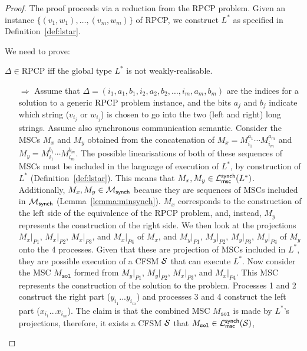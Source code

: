 \begin{proof}
	The proof proceeds via a reduction from the RPCP problem.
	Given an instance $\{(v_1, w_1), \ldots, (v_m, w_m)\}$ of RPCP, we
	construct $L^*$ as specified in Definition~\ref{def:lstar}.
	
	We need to prove:
	\begin{center}
		$\Delta \in \text{RPCP}$ iff the global type $L^*$ is not weakly-realisable.
	\end{center}

	\begin{itemize}
		\item[$\Rightarrow$]
			Assume that
			$\Delta = (i_1, a_1, b_1, i_2, a_2, b_2, \ldots, i_m, a_m, b_m)$ are the indices
			for a solution to a generic RPCP problem instance, and the bits $a_j$ and
			$b_j$ indicate which string ($v_{i_j}$ or $w_{i_j}$) is chosen to go into
			the two (left and right) long strings. Assume also synchronous communication semantic.
			Consider the MSCs $M_x$ and $M_y$ obtained from the concatenation of
			$M_x = M^{a_1}_{i_1} \cdots M^{a_m}_{i_m}$ 
			and $M_y = M^{b_1}_{i_1} \cdots M^{b_m}_{i_m}$.
			The possible linearisations of both of these sequences of MSCs 
			must be included in the language of execution of $L^*$, by construction 
			of $L^*$ (Definition~\ref{def:lstar}). 
			This means that $M_x, M_y \in \mathcal{L}_{\mathsf{msc}}^{\mathsf{synch}}(L^*)$.
			Additionally, $M_x,M_y\in \mathcal{M}_{\mathsf{synch}}$
			because they are sequences of MSCs included in
			$\mathcal{M}_{\mathsf{synch}}$ (Lemma~\ref{lemma:minsynch}).
			$M_x$ corresponds to the construction of the left side of the equivalence of the RPCP
			problem, and, instead, $M_y$ represents the construction of the right side.
			We then look at the projections $M_x|_{P1}$, $M_x|_{P2}$, $M_x|_{P3}$,
			and $M_x|_{P4}$ of $M_x$, and $M_y|_{P1}$, $M_y|_{P2}$, $M_y|_{P3}$, $M_y|_{P4}$ of $M_y$ onto the
			4 processes.
			Given that these are projection of MSCs included in $L^*$,
			they are possible execution of a CFSM $\mathcal{S}$ that can execute $L^*$.
			Now consider the MSC $M_{\texttt{sol}}$ 
			formed from $M_y|_{P1}$, $M_y|_{P2}$, $M_x|_{P3}$, and $M_x|_{P4}$.
			This MSC represents the construction of the solution to
			the problem. Processes 1 and 2 construct the right part ($y_{i_1}...y_{i_m}$)
			and processes 3 and 4 construct the left part ($x_{i_1}...x_{i_m}$).
			The claim is that the combined MSC $M_{\texttt{sol}}$ is 
			made by $L^*$'s projections, therefore, it exists a CFSM $\mathcal{S}$
			that $M_{\texttt{sol}} \in \mathcal{L}_{\mathsf{msc}}^{\mathsf{synch}}(\mathcal{S})$,

\end{itemize}
\end{proof}
